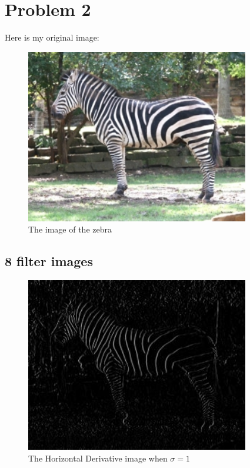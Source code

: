 \documentclass[11pt,psfig]{article}
\begin{document}
\newpage

\section*{Problem 2}

Here is my original image:

\begin{figure}[H]
\centering
\includegraphics[height=3in]{zebra_small.jpg}
\caption{The image of the zebra}
\end{figure}

\subsection*{8 filter images}

\begin{figure}[H]
\centering
\includegraphics[height=3in]{sigma_1_horizDeriv_zebra_small.jpg}
\caption{The Horizontal Derivative image when $\sigma=1$}
\end{figure}
\end{document}
